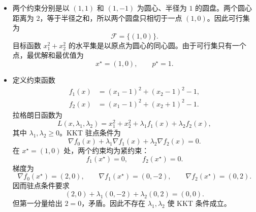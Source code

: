 \documentclass[12pt,a4paper]{article}
\begin{document}
\begin{itemize}
  \item[(a)] 两个约束分别是以 $(1,1)$ 和 $(1,-1)$ 为圆心、半径为 $1$ 的圆盘。两个圆心距离为 $2$，等于半径之和，所以两个圆盘只相切于一点 $(1,0)$。因此可行集为
  \[
    \mathcal F=\{(1,0)\}.
  \]
  目标函数 $x_1^2+x_2^2$ 的水平集是以原点为圆心的同心圆。由于可行集只有一个点，最优解和最优值为
  \[
    \boxed{x^\star=(1,0),\qquad p^\star=1.}
  \]

  \item[(b)] 定义约束函数
  \[
  \begin{aligned}
    f_1(x)&=(x_1-1)^2+(x_2-1)^2-1,\\
    f_2(x)&=(x_1-1)^2+(x_2+1)^2-1.
  \end{aligned}
  \]
  拉格朗日函数为
  \[
    L(x,\lambda_1,\lambda_2)
    =x_1^2+x_2^2+\lambda_1f_1(x)+\lambda_2f_2(x),
  \]
  其中 $\lambda_1,\lambda_2\geq0$。KKT 驻点条件为
  \[
    \nabla f_0(x)+\lambda_1\nabla f_1(x)+\lambda_2\nabla f_2(x)=0.
  \]
  在 $x^\star=(1,0)$ 处，两个约束均为紧约束：
  \[
    f_1(x^\star)=0,\qquad f_2(x^\star)=0.
  \]
  梯度为
  \[
    \nabla f_0(x^\star)=(2,0),\qquad
    \nabla f_1(x^\star)=(0,-2),\qquad
    \nabla f_2(x^\star)=(0,2).
  \]
  因而驻点条件要求
  \[
    (2,0)+\lambda_1(0,-2)+\lambda_2(0,2)=(0,0).
  \]
  但第一分量给出 $2=0$，矛盾。因此不存在 $\lambda_1,\lambda_2$ 使 KKT 条件成立。




\end{itemize}
\end{document}
